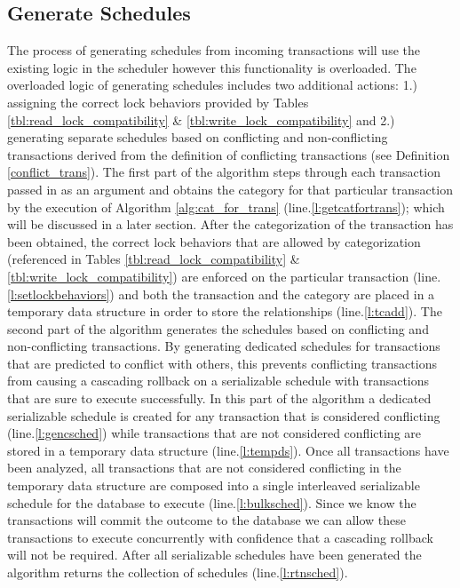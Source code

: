 \subsection{Generate Schedules}
The process of generating schedules from incoming transactions will use the existing logic in the scheduler however this functionality is overloaded. The overloaded logic of generating schedules includes two additional actions: 1.) assigning the correct lock behaviors provided by Tables \ref{tbl:read_lock_compatibility} \& \ref{tbl:write_lock_compatibility} and 2.) generating separate schedules based on conflicting and non-conflicting transactions derived from the definition of conflicting transactions (see Definition \ref{conflict_trans}). The first part of the algorithm steps through each transaction passed in as an argument and obtains the category for that particular transaction by the execution of Algorithm \ref{alg:cat_for_trans} (line.\ref{l:getcatfortrans}); which will be discussed in a later section. After the categorization of the transaction has been obtained, the correct lock behaviors that are allowed by categorization (referenced in Tables \ref{tbl:read_lock_compatibility} \& \ref{tbl:write_lock_compatibility}) are enforced on the particular transaction (line.\ref{l:setlockbehaviors}) and both the transaction and the category are placed in a temporary data structure in order to store the relationships (line.\ref{l:tcadd}). The second part of the algorithm generates the schedules based on conflicting and non-conflicting transactions. By generating dedicated schedules for transactions that are predicted to conflict with others, this prevents conflicting transactions from causing a cascading rollback on a serializable schedule with transactions that are sure to execute successfully. In this part of the algorithm a dedicated serializable schedule is created for any transaction that is considered conflicting (line.\ref{l:gencsched}) while transactions that are not considered conflicting are stored in a temporary data structure (line.\ref{l:tempds}). Once all transactions have been analyzed, all transactions that are not considered conflicting in the temporary data structure are composed into a single interleaved serializable schedule for the database to execute (line.\ref{l:bulksched}). Since we know the transactions will commit the outcome to the database we can allow these transactions to execute concurrently with confidence that a cascading rollback will not be required. After all serializable schedules have been generated the algorithm returns the collection of schedules (line.\ref{l:rtnsched}).